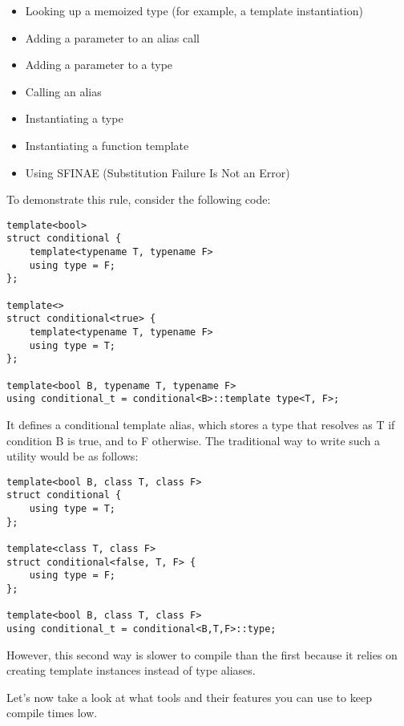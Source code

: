 \begin{itemize}
\item 
Looking up a memoized type (for example, a template instantiation)

\item 
Adding a parameter to an alias call

\item 
Adding a parameter to a type

\item 
Calling an alias

\item 
Instantiating a type

\item 
Instantiating a function template

\item 
Using SFINAE (Substitution Failure Is Not an Error)
\end{itemize}

To demonstrate this rule, consider the following code:

\begin{lstlisting}[style=styleCXX]
template<bool>
struct conditional {
	template<typename T, typename F>
	using type = F;
};

template<>
struct conditional<true> {
	template<typename T, typename F>
	using type = T;
};

template<bool B, typename T, typename F>
using conditional_t = conditional<B>::template type<T, F>;
\end{lstlisting}

It defines a conditional template alias, which stores a type that resolves as T if condition B is true, and to F otherwise. The traditional way to write such a utility would be as follows:

\begin{lstlisting}[style=styleCXX]
template<bool B, class T, class F>
struct conditional {
	using type = T;
};

template<class T, class F>
struct conditional<false, T, F> {
	using type = F;
};

template<bool B, class T, class F>
using conditional_t = conditional<B,T,F>::type;
\end{lstlisting}

However, this second way is slower to compile than the first because it relies on creating template instances instead of type aliases.

Let's now take a look at what tools and their features you can use to keep compile times low.

